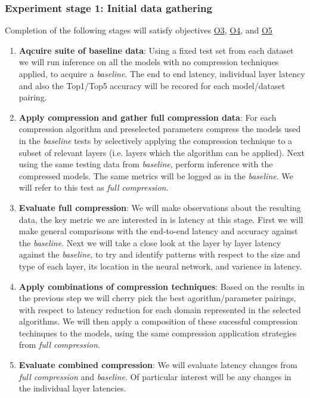 \documentclass[../D1.tex]{subfiles}
\begin{document}
\subsubsection{Experiment stage 1: Initial data gathering}\label{sec:Experiment1}
Completion of the following stages will satisfy objectives \hyperref[obj:EvalE2E]{O3}, \hyperref[obj:EvalLayer]{O4}, and \hyperref[obj:EvalComp]{O5}
\begin{enumerate}
    \item \textbf{Aqcuire suite of baseline data}: Using a fixed test set from each dataset we will run inference on all the models with no compression techniques applied, to acquire a \emph{baseline}. The end to end latency, individual layer latency and also the Top1/Top5 accuracy will be recored for each model/dataset pairing.
    \item \textbf{Apply compression and gather full compression data}: For each compression algorithm and preselected parameters compress the models used in the \emph{baseline} tests by selectively applying the compression technique to a subset of relevant layers (i.e. layers which the algorithm can be applied). Next using the same testing data from \emph{baseline}, perform inference with the compressed models. The same metrics will be logged as in the \emph{baseline}. We will refer to this test as \emph{full compression}.
    \item \textbf{Evaluate full compression}: We will make observations about the resulting data, the key metric we are interested in is latency at this stage. First we will make general comparisons with the end-to-end latency and accuracy against the \emph{baseline}. Next we will take a close look at the layer by layer latency against the \emph{baseline}, to try and identify patterns with respect to the size and type of each layer, its location in the neural network, and varience in latency. 
    \item \textbf{Apply combinations of compression techniques}: Based on the results in the previous step we will cherry pick the best agorithm/parameter pairings, with respect to latency reduction for each domain represented in the selected algorithms. We will then apply a composition of these sucessful compression techinques to the models, using the same compression application strategies from \emph{full compression}.
    \item \textbf{Evaluate combined compression}: We will evaluate latency changes from \emph{full compression} and \emph{baseline}. Of particular interest will be any changes in the individual layer latencies.
\end{enumerate}
\end{document}
